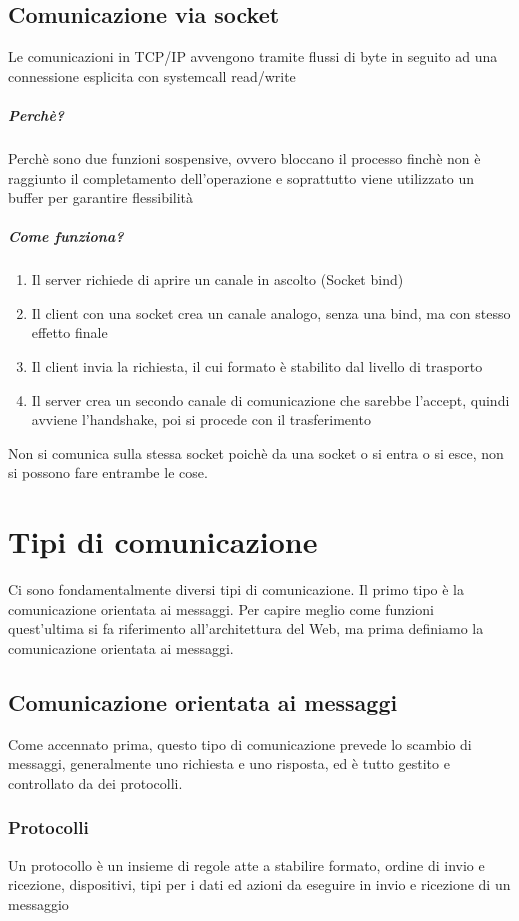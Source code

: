 \documentclass[12pt, a4paper, openany, twoside]{book}
\begin{document}
\section{Comunicazione via socket}
Le comunicazioni in TCP/IP avvengono tramite flussi di byte in seguito ad una
connessione esplicita con systemcall read/write
\paragraph{Perchè?} Perchè sono due funzioni sospensive, ovvero bloccano il processo
finchè non è raggiunto il completamento dell'operazione e soprattutto viene
utilizzato un buffer per garantire flessibilità
\paragraph{Come funziona?}
\begin{enumerate}
	\item Il server richiede di aprire un canale in ascolto (Socket bind)
	\item Il client con una socket crea un canale analogo, senza una bind, ma 
	con stesso effetto finale
	\item Il client invia la richiesta, il cui formato è stabilito dal livello
	di trasporto
	\item Il server crea un secondo canale di comunicazione che sarebbe l'accept,
	quindi avviene l'handshake, poi si procede con il trasferimento
\end{enumerate}
Non si comunica sulla stessa socket poichè da una socket o si entra o si esce,
non si possono fare entrambe le cose.
\chapter{Tipi di comunicazione}
Ci sono fondamentalmente diversi tipi di comunicazione. Il primo tipo è la 
comunicazione orientata ai messaggi. Per capire meglio come funzioni quest'ultima
si fa riferimento all'architettura del Web, ma prima definiamo la comunicazione
orientata ai messaggi.
\section{Comunicazione orientata ai messaggi}
Come accennato prima, questo tipo di comunicazione prevede lo scambio di messaggi,
generalmente uno richiesta e uno risposta, ed è tutto gestito e controllato da 
dei protocolli.
\subsection{Protocolli}
Un protocollo è un insieme di regole atte a stabilire formato, ordine di invio e
ricezione, dispositivi, tipi per i dati ed azioni da eseguire in invio e ricezione
di un messaggio
\end{document}
